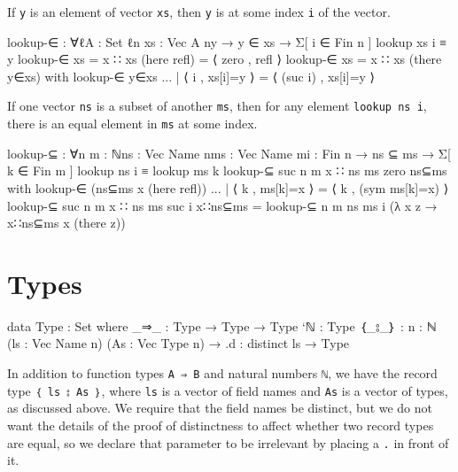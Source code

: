 If \texttt{y} is an element of vector \texttt{xs}, then \texttt{y} is at
some index \texttt{i} of the vector.

\begin{fence}
\begin{code}
lookup-∈ : ∀{ℓ}{A : Set ℓ}{n} {xs : Vec A n}{y}
   → y ∈ xs
   → Σ[ i ∈ Fin n ] lookup xs i ≡ y
lookup-∈ {xs = x ∷ xs} (here refl) = ⟨ zero , refl ⟩
lookup-∈ {xs = x ∷ xs} (there y∈xs)
    with lookup-∈ y∈xs
... | ⟨ i , xs[i]=y ⟩ = ⟨ (suc i) , xs[i]=y ⟩
\end{code}
\end{fence}

If one vector \texttt{ns} is a subset of another \texttt{ms}, then for
any element \texttt{lookup\ ns\ i}, there is an equal element in
\texttt{ms} at some index.

\begin{fence}
\begin{code}
lookup-⊆ : ∀{n m : ℕ}{ns : Vec Name n}{ms : Vec Name m}{i : Fin n}
   → ns ⊆ ms
   → Σ[ k ∈ Fin m ] lookup ns i ≡ lookup ms k
lookup-⊆ {suc n} {m} {x ∷ ns} {ms} {zero} ns⊆ms
    with lookup-∈ (ns⊆ms x (here refl))
... | ⟨ k , ms[k]=x ⟩ =
      ⟨ k , (sym ms[k]=x) ⟩
lookup-⊆ {suc n} {m} {x ∷ ns} {ms} {suc i} x∷ns⊆ms =
    lookup-⊆ {n} {m} {ns} {ms} {i} (λ x z → x∷ns⊆ms x (there z))
\end{code}
\end{fence}

\hypertarget{types}{%
\section{Types}\label{types}}

\begin{fence}
\begin{code}
data Type : Set where
  _⇒_   : Type → Type → Type
  `ℕ    : Type
  ｛_⦂_｝ : {n : ℕ} (ls : Vec Name n) (As : Vec Type n) → .{d : distinct ls} → Type
\end{code}
\end{fence}

In addition to function types \texttt{A\ ⇒\ B} and natural numbers
\texttt{ℕ}, we have the record type \texttt{｛\ ls\ ⦂\ As\ ｝}, where
\texttt{ls} is a vector of field names and \texttt{As} is a vector of
types, as discussed above. We require that the field names be distinct,
but we do not want the details of the proof of distinctness to affect
whether two record types are equal, so we declare that parameter to be
irrelevant by placing a \texttt{.} in front of it.


